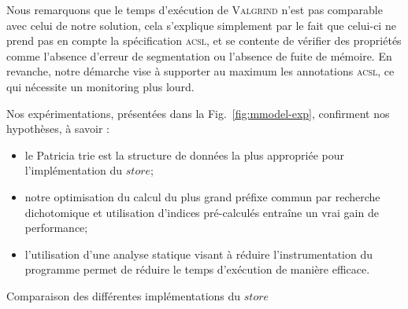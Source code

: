 \documentclass[french]{spimufcphdthesis}
\begin{document}
Nous remarquons que le temps d'exécution de \textsc{Valgrind} n'est pas
comparable avec celui de notre solution, cela s'explique simplement par le fait
que celui-ci ne prend pas en compte la spécification \textsc{acsl}, et se
contente de vérifier des propriétés comme l'absence d'erreur de segmentation ou
l'absence de fuite de mémoire. En revanche, notre démarche vise à supporter au
maximum les annotations \textsc{acsl}, ce qui nécessite un monitoring plus
lourd.

Nos expérimentations, présentées dans la Fig.~\ref{fig:mmodel-exp}, confirment
nos hypothèses, à savoir :
\begin{itemize}
\item le Patricia trie est la structure de données la plus appropriée pour
  l'implémentation du $store$;
\item notre optimisation du calcul du plus grand préfixe commun par recherche
  dichotomique et utilisation d'indices pré-calculés entraîne un vrai gain de
  performance;
\item l'utilisation d'une analyse statique visant à réduire l'instrumentation
  du programme permet de réduire le temps d'exécution de manière efficace.
\end{itemize}


\begin{landscape}
  \begin{table}[h]
    \centering
    
    \label{fig:mmodel-exp}
    \caption{Comparaison des différentes implémentations du $store$}
  \end{table}
\end{landscape}



\end{document}
